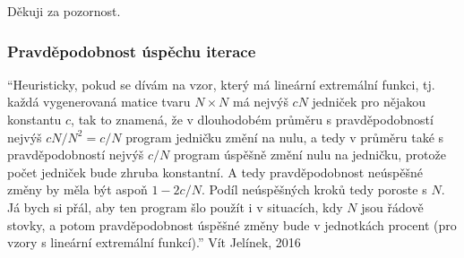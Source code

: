 \documentclass{beamer}
\begin{document}
\begin{frame}
\centering
Děkuji za pozornost.
\end{frame}

\begin{frame}
\frametitle{Pravděpodobnost úspěchu iterace}
``Heuristicky, pokud se dívám na vzor, který má lineární extremální funkci, tj. každá vygenerovaná matice tvaru $N\times N$ má nejvýš $cN$ jedniček pro nějakou konstantu $c$, tak to znamená, že v dlouhodobém průměru s pravděpodobností nejvýš $cN/N^2=c/N$ program jedničku změní na nulu, a tedy v průměru také s pravděpodobností nejvýš $c/N$ program úspěšně změní nulu na jedničku, protože počet jedniček bude zhruba konstantní. A tedy pravděpodobnost neúspěšné změny by měla být aspoň $1-2c/N$. Podíl neúspěšných kroků tedy poroste s $N$. Já bych si přál, aby ten program šlo použít i v situacích, kdy $N$ jsou řádově stovky, a potom pravděpodobnost úspěšné změny bude v jednotkách procent (pro vzory s lineární extremální funkcí).'' Vít Jelínek, 2016
\end{frame}




\end{document}
